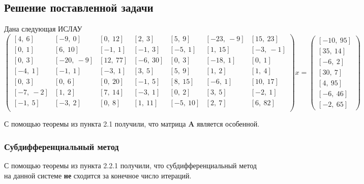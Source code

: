 \documentclass{article}
\begin{document}
    
    \subsection{Решение поставленной задачи}
    Дана следующая ИСЛАУ 
    \begin{equation*}
        \begin{pmatrix}
             [4, \ 6] & [-9, \ 0] & [0, \ 12] & [2, \ 3] & [5, \ 9] & [-23, \ -9] & [15, \ 23]\\
             [0, \ 1] & [6, \ 10] & [-1, \ 1] & [-1, \ 3] & [-5, \ 1] & [1, \ 15] & [-3, \ -1]\\
             [0, \ 3] & [-20, \ -9] & [12, \ 77] & [-6, \ 30] & [0, \ 3] & [-18, \ 1] & [0, \ 1]\\
             [-4, \ 1] & [-1, \ 1] & [-3, \ 1] & [3, \ 5] & [5, \ 9] & [1, \ 2] & [1, \ 4]\\
             [0, \ 3] & [0, \ 6] & [0, \ 20] & [-1, \ 5] & [8, \ 15] & [-6, \ 1] & [10, \ 17]\\
             [-7, \ -2] & [1, \ 2] & [7, \ 14] & [-3, \ 1] & [0, \ 2] & [3, \ 5] & [-2, \ 1]\\
             [-1, \ 5] & [-3, \ 2] & [0, \ 8] & [1, \ 11] & [-5, \ 10] & [2, \ 7] & [6, \ 82]\\
        \end{pmatrix}
        x
        =
        \begin{pmatrix}
             [-10, \ 95] \\
             [35, \ 14] \\
             [-6, \ 2] \\
             [30, \ 7] \\
             [4, \ 95] \\
             [-6, \ 46] \\
             [-2, \ 65] 
        \end{pmatrix}
        
    \end{equation*}
    
    С помощью теоремы из пункта 2.1 получили, что матрица \textbf{A} является особенной.
    
    
    \subsubsection{Субдифференциальный метод}
    С помощью теоремы из пункта 2.2.1 получили, что субдифференциальный метод на данной системе \textbf{не} сходится за конечное число итераций.\\
    
\end{document}
